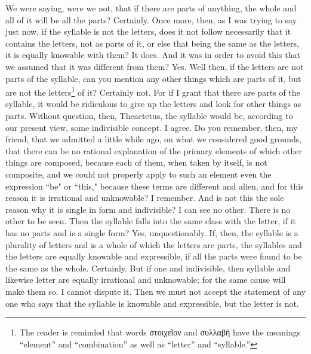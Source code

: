 \documentclass[letterpaper,12pt]{article}
\newcommand{\textgreek}[1]{\begingroup\fontencoding{LGR}\selectfont#1\endgroup}
\newcommand{\stephpag}[1]{\marginnote{\small\itshape\fontfamily{ppl}\selectfont #1}}
\begin{document}
\begin{drama}
\socratesspeaks
We were saying, were we not, that if there are parts of anything, the whole and all of it will be all the parts?
\theaetetusspeaks
Certainly.
\socratesspeaks
Once more, then, as I was trying to say just now, if the syllable is not the letters, does it not follow necessarily \stephpag{b} that it contains the letters, not as parts of it, or else that being the same as the letters, it is equally knowable with them?
\theaetetusspeaks
It does.
\socratesspeaks
And it was in order to avoid this that we assumed that it was different from them?
\theaetetusspeaks
Yes.
\socratesspeaks
Well then, if the letters are not parts of the syllable, can you mention any other things which are parts of it, but are not the letters\footnote{The reader is reminded that words \textgreek{στοιχεῖον} and \textgreek{συλλαβή} have the meanings ``element'' and ``combination'' as well as ``letter'' and ``syllable.''} of it?
\theaetetusspeaks
Certainly not. For if I grant that there are parts of the syllable, it would be ridiculous to give up the letters and look for other things as parts. \stephpag{c}
\socratesspeaks
Without question, then, Theaetetus, the syllable would be, according to our present view, some indivisible concept.
\theaetetusspeaks
I agree.
\socratesspeaks
Do you remember, then, my friend, that we admitted a little while ago, on what we considered good grounds, that there can be no rational explanation of the primary elements of which other things are composed, because each of them, when taken by itself, is not composite, and we could not properly apply to such an element even the expression ``be" or ``this," because these terms are different and alien, and for this reason it is irrational and unknowable?
\theaetetusspeaks
I remember. \stephpag{d}
\socratesspeaks
And is not this the sole reason why it is single in form and indivisible? I can see no other.
\theaetetusspeaks
There is no other to be seen.
\socratesspeaks
Then the syllable falls into the same class with the letter, if it has no parts and is a single form?
\theaetetusspeaks
Yes, unquestionably.
\socratesspeaks
If, then, the syllable is a plurality of letters and is a whole of which the letters are parts, the syllables and the letters are equally knowable and expressible, if all the parts were found to be the same as the whole. \stephpag{e}
\theaetetusspeaks
Certainly.
\socratesspeaks
But if one and indivisible, then syllable and likewise letter are equally irrational and unknowable; for the same cause will make them so.
\theaetetusspeaks
I cannot dispute it.
\socratesspeaks
Then we must not accept the statement of any one who says that the syllable is knowable and expressible, but the letter is not.

\end{drama}
\end{document}
